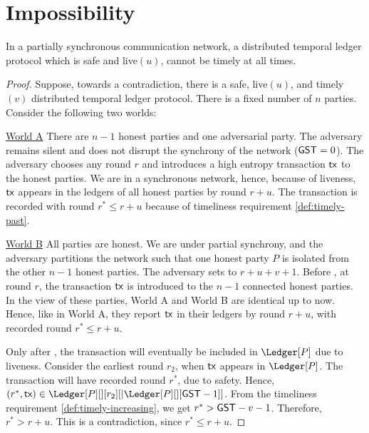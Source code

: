 \section{Impossibility}

\begin{theorem}
  In a partially synchronous communication network, a distributed temporal ledger protocol
  which is safe and live$(u)$, cannot be timely at all times.
\end{theorem}
\begin{proof}
  Suppose, towards a contradiction, there is a safe, live$(u)$, and timely$(v)$ distributed temporal ledger protocol.
  There is a fixed number of $n$ parties.
  Consider the following two worlds:

  \noindent
  \underline{World A}
  There are $n-1$ honest parties and one adversarial party. The adversary remains silent and
  does not disrupt the synchrony of the network ($\textsf{GST} = 0$).
  The adversary chooses any round $r$ and introduces a high entropy transaction $\textsf{tx}$ to the honest parties. We are in a
  synchronous network, hence, because of liveness, $\textsf{tx}$ appears in the ledgers of all honest parties
  by round $r + u$. The transaction is recorded with round $r^* \leq r + u$ because of
  timeliness requirement \ref{def:timely-past}.

  \noindent
  \underline{World B}
  All parties are honest. We are under partial synchrony, and the adversary partitions the network such that
  one honest party $P$ is isolated from the other $n-1$ honest parties.
  The adversary sets \gst to  $r + u + v + 1$.
  Before \gst, at round $r$, the transaction $\textsf{tx}$ is introduced to the $n-1$ connected
  honest parties. In the view of these parties,
  World A and World B are identical up to now. Hence, like in World A,
  they report $\textsf{tx}$ in their ledgers by round $r + u$, with recorded round $r^* \leq r + u$.

  Only after \gst, the transaction will eventually be included in $\Ledger[P]$ due to liveness.
  Consider the earliest round $r_2$, when $\textsf{tx}$ appears in $\Ledger[P]$.
  The transaction will have recorded round $r^*$, due to safety.
  Hence, $(r^*, \tx) \in \Ledger[P][][r_2][|\Ledger[P][][\gst - 1]]$.
  From the timeliness requirement \ref{def:timely-increasing}, we
  get $r^* > \textsf{GST} - v - 1$. Therefore, $r^* > r + u$.
  This is a contradiction, since $r^* \leq r + u$.
\end{proof}

